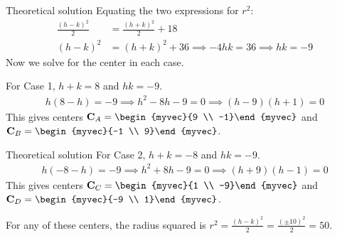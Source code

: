 \documentclass{beamer}
\numberwithin{equation}{section}
\theoremstyle{remark}
\let\vec\mathbf
\begin{document}
	\begin{frame}{Theoretical solution}
		Equating the two expressions for $r^2$:
		\begin{align}
			\frac{(h-k)^2}{2} &= \frac{(h+k)^2}{2} + 18 \nonumber \\
			(h-k)^2 &= (h+k)^2 + 36 \implies -4hk = 36 \implies hk = -9
		\end{align}
		Now we solve for the center in each case.
		
		For Case 1, $h+k=8$ and $hk=-9$. 
		\begin{align}
			h(8-h)=-9 \implies h^2-8h-9=0 \implies (h-9)(h+1)=0
		\end{align}
		This gives centers $\vec{C}_A = \begin{myvec}{9 \\ -1}\end{myvec}$ and $\vec{C}_B = \begin{myvec}{-1 \\ 9}\end{myvec}$.
	\end{frame}
	
	\begin{frame}{Theoretical solution}
		For Case 2, $h+k=-8$ and $hk=-9$. 
		\begin{align}
			h(-8-h)=-9 \implies h^2+8h-9=0 \implies (h+9)(h-1)=0
		\end{align}
		This gives centers $\vec{C}_C = \begin{myvec}{1 \\ -9}\end{myvec}$ and $\vec{C}_D = \begin{myvec}{-9 \\ 1}\end{myvec}$.
		
		For any of these centers, the radius squared is $r^2 = \frac{(h-k)^2}{2} = \frac{(\pm 10)^2}{2} = 50$.
		\end{frame}
			
\end{document}
